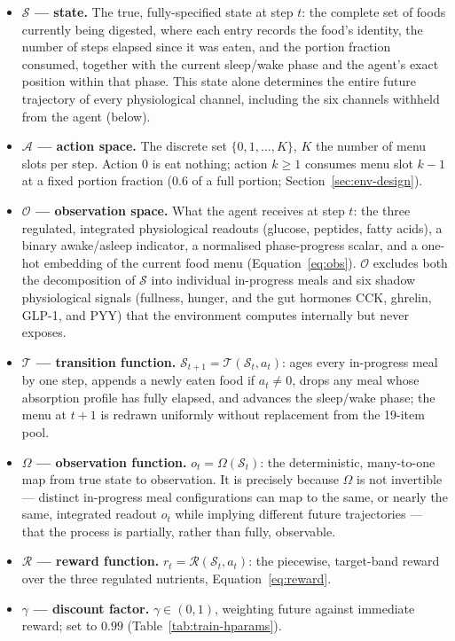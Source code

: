 \documentclass[10pt,twocolumn]{article}
\begin{document}
\begin{itemize}
\item \textbf{$\mathcal{S}$ — state.} The true, fully-specified state at step $t$: the complete set of foods currently being digested, where each entry records the food's identity, the number of steps elapsed since it was eaten, and the portion fraction consumed, together with the current sleep/wake phase and the agent's exact position within that phase. This state alone determines the entire future trajectory of every physiological channel, including the six channels withheld from the agent (below).
\item \textbf{$\mathcal{A}$ — action space.} The discrete set $\{0,1,\dots,K\}$, $K$ the number of menu slots per step. Action $0$ is eat nothing; action $k\!\geq\!1$ consumes menu slot $k{-}1$ at a fixed portion fraction (0.6 of a full portion; Section~\ref{sec:env-design}).
\item \textbf{$\mathcal{O}$ — observation space.} What the agent receives at step $t$: the three regulated, integrated physiological readouts (glucose, peptides, fatty acids), a binary awake/asleep indicator, a normalised phase-progress scalar, and a one-hot embedding of the current food menu (Equation~\eqref{eq:obs}). $\mathcal{O}$ excludes both the decomposition of $\mathcal{S}$ into individual in-progress meals and six shadow physiological signals (fullness, hunger, and the gut hormones CCK, ghrelin, GLP-1, and PYY) that the environment computes internally but never exposes.
\item \textbf{$\mathcal{T}$ — transition function.} $\mathcal{S}_{t+1}=\mathcal{T}(\mathcal{S}_t,a_t)$: ages every in-progress meal by one step, appends a newly eaten food if $a_t\neq 0$, drops any meal whose absorption profile has fully elapsed, and advances the sleep/wake phase; the menu at $t{+}1$ is redrawn uniformly without replacement from the 19-item pool.
\item \textbf{$\Omega$ — observation function.} $o_t=\Omega(\mathcal{S}_t)$: the deterministic, many-to-one map from true state to observation. It is precisely because $\Omega$ is not invertible — distinct in-progress meal configurations can map to the same, or nearly the same, integrated readout $o_t$ while implying different future trajectories — that the process is partially, rather than fully, observable.
\item \textbf{$\mathcal{R}$ — reward function.} $r_t=\mathcal{R}(\mathcal{S}_t,a_t)$: the piecewise, target-band reward over the three regulated nutrients, Equation~\eqref{eq:reward}.
\item \textbf{$\gamma$ — discount factor.} $\gamma\in(0,1)$, weighting future against immediate reward; set to $0.99$ (Table~\ref{tab:train-hparams}).
\end{itemize}
\end{document}

